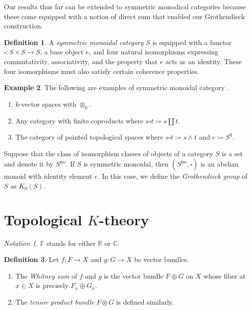 \documentclass[10pt,letterpaper,cm]{nupset}
\theoremstyle{definition}
\newtheorem{definition}{Definition}[section]
\newtheorem{exmp}[definition]{Example}
\theoremstyle{theorem}
\theoremstyle{remark}
\newtheorem*{notation}{Notation}
\newcommand{\C}{\mathbb C}
\newcommand{\F}{\mathbb F}
\newcommand{\R}{\mathbb R}
\newcommand{\1}{\mathbf{1}}
\newcommand{\0}{\vec 0}
\DeclareMathOperator{\iso}{iso}
\begin{document}
\bigskip



Our results thus far can be extended to symmetric monodical categories because these come equipped with a notion of direct sum that enabled our Grothendieck construction. 

\begin{definition}
A \textit{symmetric monoidal category} $S$ is equipped with a functor $\square : S \times S \to S$, a base object $e$, and four natural isomorphisms expressing commutativity, associativity, and the property that $e$ acts as an identity. These four isomorphisms must also satisfy certain coherence properties.
\end{definition}

\begin{exmp} The following are examples of symmetric monoidal category	.
\begin{enumerate}
\item $k$-vector spaces with $\otimes_k$.
\item Any category with finite coproducts where $s \square t\coloneqq s \amalg t$.
\item The category of pointed topological spaces where $s \square t \coloneqq s \wedge t $ and $e\coloneqq S^0$.
\end{enumerate} 
\end{exmp}

Suppose that the class of isomorphism classes of objects of a category $S$ is a set and denote it by $S^{\iso}$. If $S$ is symmetric monoidal, then $\left(S^{\iso}, \square\right)$ is an abelian monoid with identity element $e$. In this case, we define the \textit{Grothendieck group} of $S$ as $K_0(S)$.

\section{Topological $K$-theory}

\begin{notation}
$\F$ stands for either $\R$ or $\C$.
\end{notation}

\begin{definition}
Let $f: F \to X$ and $g: G \to X$ be vector bundles. 
\begin{enumerate}
\item The \textit{Whitney sum} of $f$ and $g$ is the vector bundle $F \oplus G$ on $X$ whose fiber at $x \in X$ is precisely $F_x \oplus G_x$.  
\item The \textit{tensor product bundle} $F \otimes G$ is defined similarly.
\end{enumerate}
\end{definition}
\end{document}

